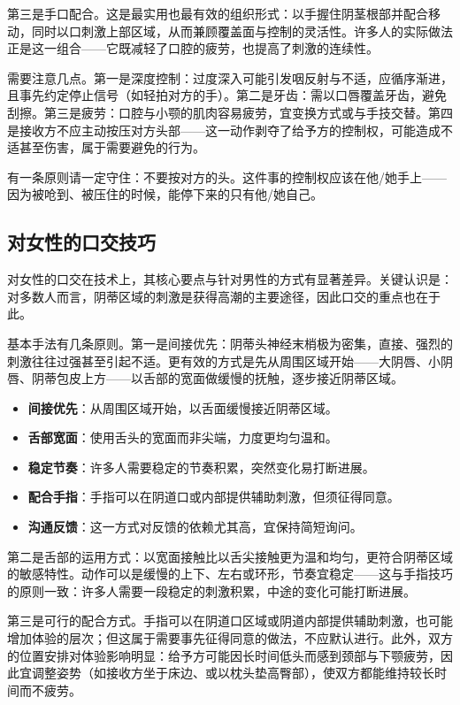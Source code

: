\documentclass[12pt,UTF8]{ctexbook}
\newcommand{\keyword}[1]{\textbf{#1}}
\begin{document}
第三是手口配合。这是最实用也最有效的组织形式：以手握住阴茎根部并配合移动，同时以口刺激上部区域，从而兼顾覆盖面与控制的灵活性。许多人的实际做法正是这一组合——它既减轻了口腔的疲劳，也提高了刺激的连续性。

需要注意几点。第一是深度控制：过度深入可能引发咽反射与不适，应循序渐进，且事先约定停止信号（如轻拍对方的手）。第二是牙齿：需以口唇覆盖牙齿，避免刮擦。第三是疲劳：口腔与小颚的肌肉容易疲劳，宜变换方式或与手技交替。第四是接收方不应主动按压对方头部——这一动作剥夺了给予方的控制权，可能造成不适甚至伤害，属于需要避免的行为。

\begin{tcolorbox}[colback=pink!5!white,colframe=red!50!black,title=贴心小叮咛]
	有一条原则请一定守住：不要按对方的头。这件事的控制权应该在他/她手上——因为被呛到、被压住的时候，能停下来的只有他/她自己。
\end{tcolorbox}
\subsection{对女性的口交技巧}

对女性的口交在技术上，其核心要点与针对男性的方式有显著差异。关键认识是：对多数人而言，阴蒂区域的刺激是获得高潮的主要途径，因此口交的重点也在于此。

基本手法有几条原则。第一是间接优先：阴蒂头神经末梢极为密集，直接、强烈的刺激往往过强甚至引起不适。更有效的方式是先从周围区域开始——大阴唇、小阴唇、阴蒂包皮上方——以舌部的宽面做缓慢的抚触，逐步接近阴蒂区域。

\begin{itemize}
	\item \keyword{间接优先}：从周围区域开始，以舌面缓慢接近阴蒂区域。
	\item \keyword{舌部宽面}：使用舌头的宽面而非尖端，力度更均匀温和。
	\item \keyword{稳定节奏}：许多人需要稳定的节奏积累，突然变化易打断进展。
	\item \keyword{配合手指}：手指可以在阴道口或内部提供辅助刺激，但须征得同意。
	\item \keyword{沟通反馈}：这一方式对反馈的依赖尤其高，宜保持简短询问。
\end{itemize}

第二是舌部的运用方式：以宽面接触比以舌尖接触更为温和均匀，更符合阴蒂区域的敏感特性。动作可以是缓慢的上下、左右或环形，节奏宜稳定——这与手指技巧的原则一致：许多人需要一段稳定的刺激积累，中途的变化可能打断进展。

第三是可行的配合方式。手指可以在阴道口区域或阴道内部提供辅助刺激，也可能增加体验的层次；但这属于需要事先征得同意的做法，不应默认进行。此外，双方的位置安排对体验影响明显：给予方可能因长时间低头而感到颈部与下颚疲劳，因此宜调整姿势（如接收方坐于床边、或以枕头垫高臀部），使双方都能维持较长时间而不疲劳。
\end{document}
